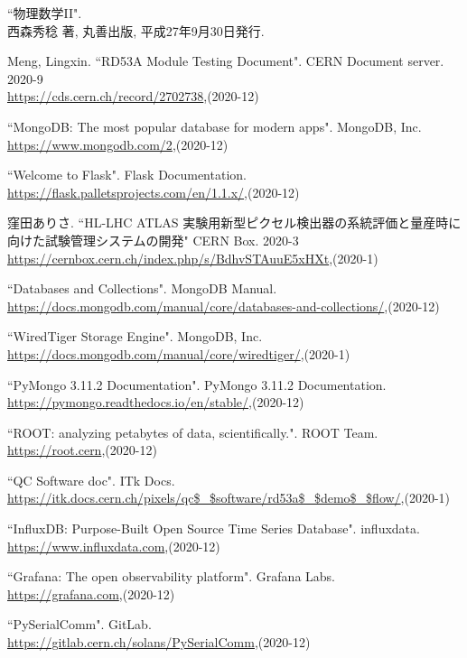 \begin{thebibliography}{9}
``物理数学II".\\
西森秀稔 著, 丸善出版, 平成27年9月30日発行.

Meng, Lingxin. ``RD53A Module Testing Document". CERN Document server. 2020-9\\
\url{https://cds.cern.ch/record/2702738},(2020-12)

``MongoDB: The most popular database for modern apps". MongoDB, Inc. \\
\url{https://www.mongodb.com/2},(2020-12)

``Welcome to Flask". Flask Documentation. \\
\url{https://flask.palletsprojects.com/en/1.1.x/},(2020-12)

窪田ありさ. ``HL-LHC ATLAS 実験用新型ピクセル検出器の系統評価と量産時に向けた試験管理システムの開発" CERN Box. 2020-3\\
\url{https://cernbox.cern.ch/index.php/s/BdhvSTAuuE5xHXt},(2020-1)

``Databases and Collections". MongoDB Manual. \\
\url{https://docs.mongodb.com/manual/core/databases-and-collections/},(2020-12)

``WiredTiger Storage Engine". MongoDB, Inc. \\
\url{https://docs.mongodb.com/manual/core/wiredtiger/},(2020-1)

``PyMongo 3.11.2 Documentation". PyMongo 3.11.2 Documentation.\\
\url{https://pymongo.readthedocs.io/en/stable/},(2020-12)

``ROOT: analyzing petabytes of data, scientifically.". ROOT Team.\\ 
\url{https://root.cern},(2020-12)

``QC Software doc". ITk Docs. \\
\url{https://itk.docs.cern.ch/pixels/qc$\_$software/rd53a$\_$demo$\_$flow/},(2020-1)

``InfluxDB: Purpose-Built Open Source Time Series Database". influxdata. \\
\url{https://www.influxdata.com},(2020-12)

``Grafana: The open observability platform". Grafana Labs. \\
\url{https://grafana.com},(2020-12)

``PySerialComm". GitLab. \\
\url{https://gitlab.cern.ch/solans/PySerialComm},(2020-12)


\end{thebibliography}
